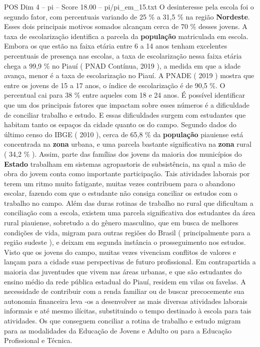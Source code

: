 \begin{textsample}{POS Dim 4 – pi – Score 18.00 – pi/pi\_em\_15.txt}
O desinteresse pela escola foi o segundo fator, com percentuais variando de 25 \% a 31,5 \% na região \textbf{Nordeste}.
Esses dois principais motivos somados alcançam cerca de 70 \% desses jovens.
A taxa de escolarização identifica a parcela da \textbf{população} matriculada em escola.
Embora os que estão na faixa etária entre 6 a 14 anos tenham excelentes percentuais de presença nas escolas, a taxa de escolarização nessa faixa etária chega a 99,9 \% no Piauí ( PNAD Contínua, 2019 ), a medida em que a idade avança, menor é a taxa de escolarização no Piauí.
A PNADE ( 2019 ) mostra que entre os jovens de 15 a 17 anos, o índice de escolarização é de 90,5 \%.
O percentual cai para 38 \% entre aqueles com 18 e 24 anos.
É possível identificar que um dos principais fatores que impactam sobre esses números é a dificuldade de conciliar trabalho e estudo.
E essas dificuldades surgem com estudantes que habitam tanto os espaços da cidade quanto os do campo.
Segundo dados do último censo do IBGE ( 2010 ), cerca de 65,8 \% da \textbf{população} piauiense está concentrada na \textbf{zona} urbana, e uma parcela bastante significativa na \textbf{zona} rural ( 34,2 \% ).
Assim, parte das famílias dos jovens da maioria dos municípios do \textbf{Estado} trabalham em sistemas agropastoris de subsistência, na qual a mão de obra do jovem conta como importante participação.
Tais atividades laborais por terem um ritmo muito fatigante, muitas vezes contribuem para o abandono escolar, fazendo com que o estudante não consiga conciliar os estudos com o trabalho no campo.
Além das duras rotinas de trabalho no rural que dificultam a conciliação com a escola, existem uma parcela significativa dos estudantes da área rural piauiense, sobretudo a do gênero masculino, que em busca de melhores condições de vida, migram para outras regiões do Brasil ( principalmente para a região sudeste ), e deixam em segunda instância o prosseguimento nos estudos.
Visto que os jovens do campo, muitas vezes vivenciam conflitos de valores e lançam para a cidade suas perspectivas de futuro profissional.
Em contrapartida a maioria das juventudes que vivem nas áreas urbanas, e que são estudantes do ensino médio da rede pública estadual do Piauí, residem em vilas ou favelas.
A necessidade de contribuir com a renda familiar ou de buscar precocemente sua autonomia financeira leva -os a desenvolver as mais diversas atividades laborais informais e até mesmo ilícitas, substituindo o tempo destinado à escola para tais atividades.
Os que conseguem conciliar a rotina de trabalho e estudo migram para as modalidades da Educação de Jovens e Adulto ou para a Educação Profissional e Técnica.

\end{textsample}
